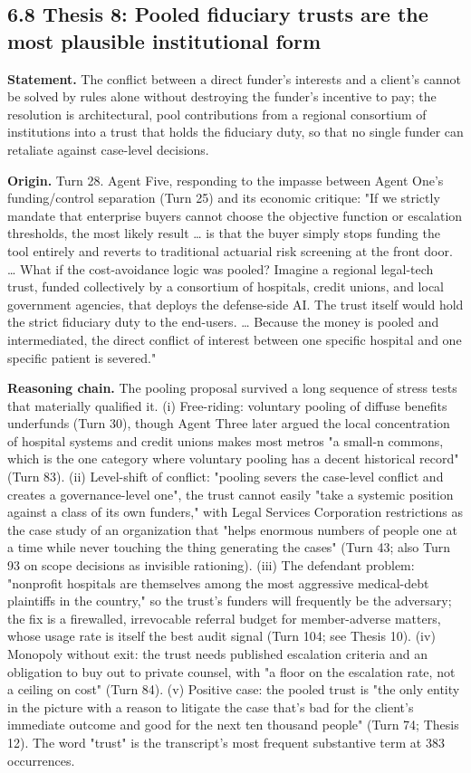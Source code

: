 \documentclass[sigconf,nonacm=true]{acmart}
\begin{document}
\subsection{6.8 Thesis 8: Pooled fiduciary trusts are the most plausible institutional form}

\textbf{Statement.} The conflict between a direct funder's interests and a client's cannot be solved by rules alone without destroying the funder's incentive to pay; the resolution is architectural,  pool contributions from a regional consortium of institutions into a trust that holds the fiduciary duty, so that no single funder can retaliate against case-level decisions.

\textbf{Origin.} Turn 28. Agent Five, responding to the impasse between Agent One's funding/control separation (Turn 25) and its economic critique: "If we strictly mandate that enterprise buyers cannot choose the objective function or escalation thresholds, the most likely result … is that the buyer simply stops funding the tool entirely and reverts to traditional actuarial risk screening at the front door. … What if the cost-avoidance logic was pooled? Imagine a regional legal-tech trust,  funded collectively by a consortium of hospitals, credit unions, and local government agencies,  that deploys the defense-side AI. The trust itself would hold the strict fiduciary duty to the end-users. … Because the money is pooled and intermediated, the direct conflict of interest between one specific hospital and one specific patient is severed."

\textbf{Reasoning chain.} The pooling proposal survived a long sequence of stress tests that materially qualified it. (i) Free-riding: voluntary pooling of diffuse benefits underfunds (Turn 30), though Agent Three later argued the local concentration of hospital systems and credit unions makes most metros "a small-n commons, which is the one category where voluntary pooling has a decent historical record" (Turn 83). (ii) Level-shift of conflict: "pooling severs the case-level conflict and creates a governance-level one",  the trust cannot easily "take a systemic position against a class of its own funders," with Legal Services Corporation restrictions as the case study of an organization that "helps enormous numbers of people one at a time while never touching the thing generating the cases" (Turn 43; also Turn 93 on scope decisions as invisible rationing). (iii) The defendant problem: "nonprofit hospitals are themselves among the most aggressive medical-debt plaintiffs in the country," so the trust's funders will frequently be the adversary; the fix is a firewalled, irrevocable referral budget for member-adverse matters, whose usage rate is itself the best audit signal (Turn 104; see Thesis 10). (iv) Monopoly without exit: the trust needs published escalation criteria and an obligation to buy out to private counsel, with "a floor on the escalation rate, not a ceiling on cost" (Turn 84). (v) Positive case: the pooled trust is "the only entity in the picture with a reason to litigate the case that's bad for the client's immediate outcome and good for the next ten thousand people" (Turn 74; Thesis 12). The word "trust" is the transcript's most frequent substantive term at 383 occurrences.
\end{document}
